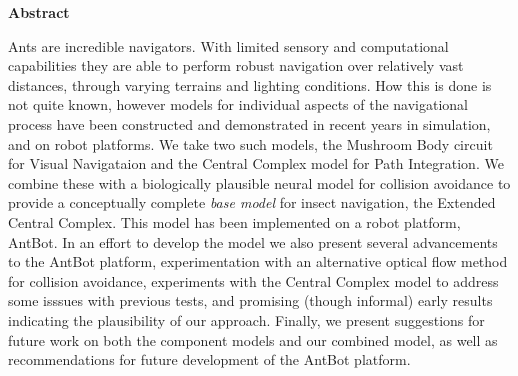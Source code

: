 \documentclass[a4paper,11pt,twoside,openright]{article}
\begin{document}
\centering
{\LARGE\textbf{Abstract}}
\begin{flushleft}
  {\small Ants are incredible navigators. With limited sensory and
    computational capabilities they are able to perform robust
    navigation over relatively vast distances, through varying
    terrains and lighting conditions. How this is done is not quite
    known, however models for individual aspects of the navigational
    process have been constructed and demonstrated in recent years in
    simulation, and on robot platforms.  We take two such models, the
    Mushroom Body circuit for Visual Navigataion and the Central
    Complex model for Path Integration. We combine these with a
    biologically plausible neural model for collision avoidance to
    provide a conceptually complete \textit{base model} for insect
    navigation, the Extended Central Complex. This model has been
    implemented on a robot platform, AntBot. In an effort to develop
    the model we also present several advancements to the AntBot
    platform, experimentation with an alternative optical flow method
    for collision avoidance, experiments with the Central Complex
    model to address some isssues with previous tests, and promising
    (though informal) early results indicating the plausibility of our
    approach. Finally, we present suggestions for future work on both
    the component models and our combined model, as well as
    recommendations for future development of the AntBot platform.}
\end{flushleft}
\newpage

\tableofcontents
\newpage

\listoffigures
\newpage

\listoftables
\newpage
\thispagestyle{empty}
\mbox{}
\newpage
\end{document}
